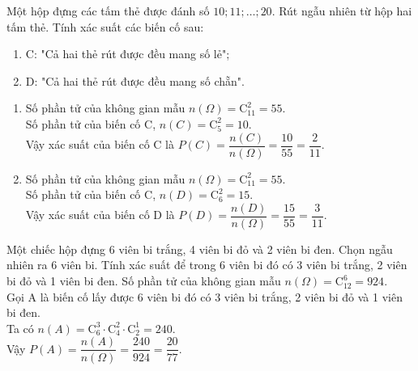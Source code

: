 \begin{bt}%
	Một hộp đựng các tấm thẻ được đánh số $10;11;\ldots; 20$. Rút ngẫu nhiên từ hộp hai tấm thẻ. Tính xác suất các biến cố sau:
	\begin{enumerate}
		\item C: "Cả hai thẻ rút được đều mang số lẻ";
		\item D: "Cả hai thẻ rút được đều mang số chẵn".
	\end{enumerate}
	\loigiai
	{
		\begin{enumerate}
			\item Số phần tử của không gian mẫu $n(\Omega) =\mathrm{C}_{11}^2=55.
			$	\\
			Số phần tử của biến cố C, $n(C)=\mathrm{C}_5^2=10$.\\
			Vậy xác suất của biến cố C là $P(C)=\dfrac{n(C)}{n(\Omega)}=\dfrac{10}{55}=\dfrac{2}{11}$.
			\item Số phần tử của không gian mẫu $n(\Omega) =\mathrm{C}_{11}^2=55.$\\
			Số phần tử của biến cố C, $n(D)=\mathrm{C}_6^2=15$.\\
			Vậy xác suất của biến cố D là $P(D)=\dfrac{n(D)}{n(\Omega)}=\dfrac{15}{55}=\dfrac{3}{11}$.
		\end{enumerate}
	}
\end{bt}

\begin{bt}%
	Một chiếc hộp đựng 6 viên bi trắng, 4 viên bi đỏ và 2 viên bi đen. Chọn ngẫu nhiên ra 6 viên bi. Tính xác suất để trong 6 viên bi đó có 3 viên bi trắng, 2 viên bi đỏ và 1 viên bi đen.
	\loigiai
	{
		Số phần tử của không gian mẫu $n(\Omega) =\mathrm{C}_{12}^6=924$.\\
		Gọi A là biến cố lấy được 6 viên bi đó có 3 viên bi trắng, 2 viên bi đỏ và 1 viên bi đen.\\
		Ta có $n(A)=\mathrm{C}_6^3\cdot \mathrm{C}_4^2\cdot \mathrm{C}_2^1=240$.\\
		Vậy $P(A)=\dfrac{n(A)}{n(\Omega)}=\dfrac{240}{924}=\dfrac{20}{77}$.
	}
\end{bt}

